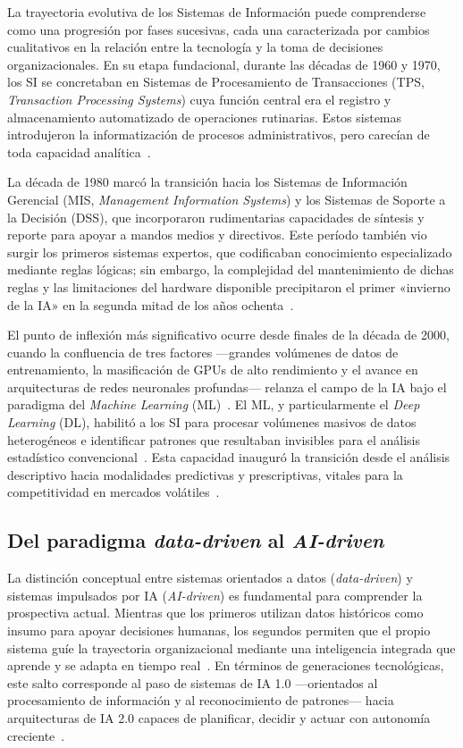 \documentclass[conference]{IEEEtran}
\begin{document}
La trayectoria evolutiva de los Sistemas de Información puede
comprenderse como una progresión por fases sucesivas, cada una
caracterizada por cambios cualitativos en la relación entre la tecnología
y la toma de decisiones organizacionales. En su etapa fundacional,
durante las décadas de 1960 y 1970, los SI se concretaban en Sistemas de
Procesamiento de Transacciones (TPS, \textit{Transaction Processing
Systems}) cuya función central era el registro y almacenamiento
automatizado de operaciones rutinarias. Estos sistemas introdujeron la
informatización de procesos administrativos, pero carecían de toda
capacidad analítica~\cite{wu2025aigen}.
 
La década de 1980 marcó la transición hacia los Sistemas de Información
Gerencial (MIS, \textit{Management Information Systems}) y los Sistemas
de Soporte a la Decisión (DSS), que incorporaron rudimentarias capacidades
de síntesis y reporte para apoyar a mandos medios y directivos. Este
período también vio surgir los primeros sistemas expertos, que codificaban
conocimiento especializado mediante reglas lógicas; sin embargo, la
complejidad del mantenimiento de dichas reglas y las limitaciones del
hardware disponible precipitaron el primer «invierno de la IA» en la
segunda mitad de los años
ochenta~\cite{storey2025genai}.
 
El punto de inflexión más significativo ocurre desde finales de la
década de 2000, cuando la confluencia de tres factores —grandes volúmenes
de datos de entrenamiento, la masificación de GPUs de alto rendimiento y
el avance en arquitecturas de redes neuronales profundas— relanza el
campo de la IA bajo el paradigma del \textit{Machine Learning}
(ML)~\cite{janiesch2021ml}. El ML, y particularmente el \textit{Deep
Learning} (DL), habilitó a los SI para procesar volúmenes masivos de
datos heterogéneos e identificar patrones que resultaban invisibles para
el análisis estadístico convencional~\cite{natta2025,seth2025}. Esta
capacidad inauguró la transición desde el análisis descriptivo hacia
modalidades predictivas y prescriptivas, vitales para la competitividad
en mercados volátiles~\cite{janiesch2021ml}.
 
\subsection{Del paradigma \textit{data-driven} al \textit{AI-driven}}
 
La distinción conceptual entre sistemas orientados a datos
(\textit{data-driven}) y sistemas impulsados por IA (\textit{AI-driven})
es fundamental para comprender la prospectiva actual. Mientras que los
primeros utilizan datos históricos como insumo para apoyar decisiones
humanas, los segundos permiten que el propio sistema guíe la trayectoria
organizacional mediante una inteligencia integrada que aprende y se
adapta en tiempo real~\cite{natta2025}. En términos de generaciones
tecnológicas, este salto corresponde al paso de sistemas de IA 1.0
—orientados al procesamiento de información y al reconocimiento de
patrones— hacia arquitecturas de IA 2.0 capaces de planificar,
decidir y actuar con autonomía creciente~\cite{wu2025aigen}.
 
\end{document}
